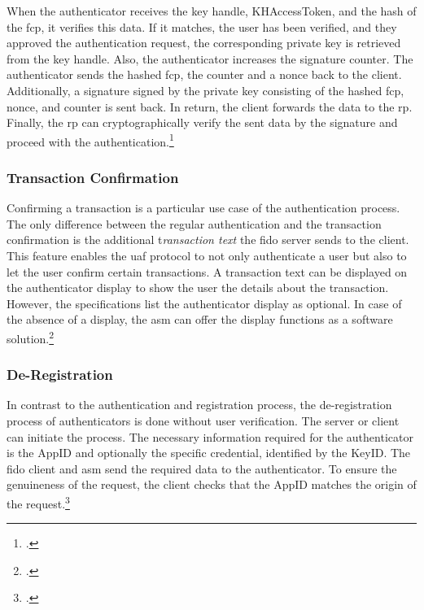When the authenticator receives the key handle, KHAccessToken, and the hash of the \gls{fcp}, it verifies this data. If it matches, the user has been verified, and they approved the authentication request, the corresponding private key is retrieved from the key handle. Also, the authenticator increases the signature counter. The authenticator sends the hashed \gls{fcp}, the counter and a \gls{nonce} back to the client. Additionally, a signature signed by the private key consisting of the hashed \gls{fcp}, nonce, and counter is sent back. In return, the client forwards the data to the \gls{rp}. Finally, the \gls{rp} can cryptographically verify the sent data by the signature and proceed with the authentication.\footcites[See][20--21]{uaf-auth-commands}[See][15]{analysis_fido_master_thesis}

\subsubsection{Transaction Confirmation}

Confirming a transaction is a particular use case of the authentication process. The only difference between the regular authentication and the transaction confirmation is the additional t\textit{ransaction text} the \gls{fido} server sends to the client. This feature enables the \gls{uaf} protocol to not only authenticate a user but also to let the user confirm certain transactions. A transaction text can be displayed on the authenticator display to show the user the details about the transaction. However, the specifications list the authenticator display as optional. In case of the absence of a display, the \gls{asm} can offer the display functions as a software solution.\footcites[See][4]{uaf-overview}[See][251]{Schwartz2018}

\subsubsection{De-Registration}

In contrast to the authentication and registration process, the de-registration process of authenticators is done without user verification. The server or client can initiate the process. The necessary information required for the authenticator is the AppID and optionally the specific credential, identified by the KeyID. The \gls{fido} client and \gls{asm} send the required data to the authenticator. To ensure the genuineness of the request, the client checks that the AppID matches the origin of the request.\footcites[See][31]{uaf-protocol}[See][7]{uaf-overview}
